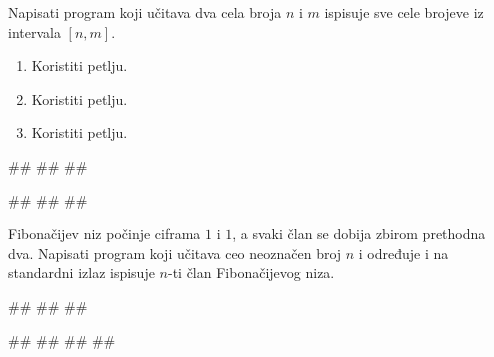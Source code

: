\begin{Exercise}[label=v1.3_11] 
Napisati program koji učitava dva cela broja $n$ i $m$ ispisuje sve
cele brojeve iz intervala $[n,m]$.
\begin{enumerate}
\item Koristiti  petlju.
\item Koristiti  petlju.
\item Koristiti  petlju.
 \end{enumerate}

\begin{miditest}
\begin{upotreba}{1}
#\naslovInt#
##
##
\end{upotreba}
\end{miditest}
\begin{miditest}
\begin{upotreba}{2}
#\naslovInt#
##
##
\end{upotreba}
\end{miditest}
\end{Exercise}
\begin{Answer}[ref=v1.3_11]
\end{Answer}


\begin{Exercise}[label=p1.4_] 
Fibonačijev niz počinje ciframa $1$ i $1$, a svaki član se dobija zbirom
prethodna dva. Napisati program koji učitava ceo neoznačen broj $n$ i
određuje i na standardni izlaz ispisuje $n$-ti član Fibonačijevog niza. 

\begin{miditest}
\begin{upotreba}{1}
#\naslovInt#
##
##
\end{upotreba}
\end{miditest}
\begin{miditest}
\begin{upotreba}{2}
#\naslovInt#
##
##
##
\end{upotreba}
\end{miditest}
\end{Exercise}
\begin{Answer}[ref=p1.4_]
\end{Answer}


